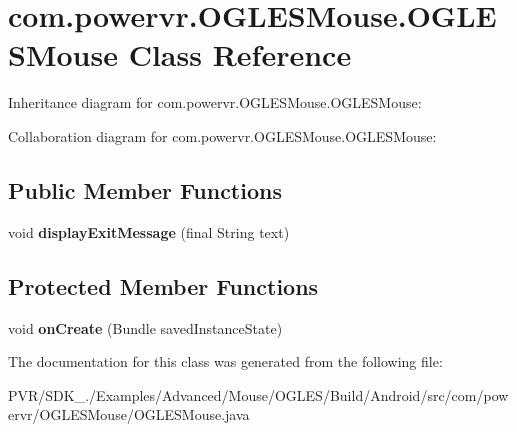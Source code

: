 \hypertarget{classcom_1_1powervr_1_1_o_g_l_e_s_mouse_1_1_o_g_l_e_s_mouse}{\section{com.\+powervr.\+O\+G\+L\+E\+S\+Mouse.\+O\+G\+L\+E\+S\+Mouse Class Reference}
\label{classcom_1_1powervr_1_1_o_g_l_e_s_mouse_1_1_o_g_l_e_s_mouse}
}


Inheritance diagram for com.\+powervr.\+O\+G\+L\+E\+S\+Mouse.\+O\+G\+L\+E\+S\+Mouse\+:


Collaboration diagram for com.\+powervr.\+O\+G\+L\+E\+S\+Mouse.\+O\+G\+L\+E\+S\+Mouse\+:
\subsection*{Public Member Functions}
\begin{DoxyCompactItemize}
\item 
\hypertarget{classcom_1_1powervr_1_1_o_g_l_e_s_mouse_1_1_o_g_l_e_s_mouse_ac4e686caa0f7b5160fbd52f4e2158de8}{void {\bfseries display\+Exit\+Message} (final String text)}\label{classcom_1_1powervr_1_1_o_g_l_e_s_mouse_1_1_o_g_l_e_s_mouse_ac4e686caa0f7b5160fbd52f4e2158de8}

\end{DoxyCompactItemize}
\subsection*{Protected Member Functions}
\begin{DoxyCompactItemize}
\item 
\hypertarget{classcom_1_1powervr_1_1_o_g_l_e_s_mouse_1_1_o_g_l_e_s_mouse_ac23421065a264ac7d7d74ae44ecd4933}{void {\bfseries on\+Create} (Bundle saved\+Instance\+State)}\label{classcom_1_1powervr_1_1_o_g_l_e_s_mouse_1_1_o_g_l_e_s_mouse_ac23421065a264ac7d7d74ae44ecd4933}

\end{DoxyCompactItemize}


The documentation for this class was generated from the following file\+:\begin{DoxyCompactItemize}
\item 
P\+V\+R/\+S\+D\+K\+\_./\+Examples/\+Advanced/\+Mouse/\+O\+G\+L\+E\+S/\+Build/\+Android/src/com/powervr/\+O\+G\+L\+E\+S\+Mouse/O\+G\+L\+E\+S\+Mouse.\+java\end{DoxyCompactItemize}
